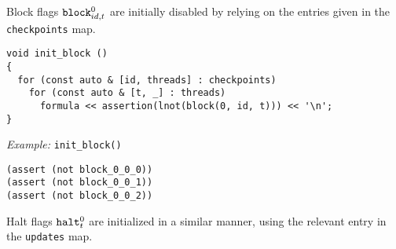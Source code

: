 \noindent
Block flags $\texttt{block}^0_{id, t}$ are initially disabled by relying on the entries given in the \texttt{checkpoints} map.

\newpage

\begin{lstlisting}[style=c++]
void init_block ()
{
  for (const auto & [id, threads] : checkpoints)
    for (const auto & [t, _] : threads)
      formula << assertion(lnot(block(0, id, t))) << '\n';
}
\end{lstlisting}

\noindent
\emph{Example:} \lstinline[style=c++]{init_block()}

\begin{lstlisting}[language=SMTLib]
(assert (not block_0_0_0))
(assert (not block_0_0_1))
(assert (not block_0_0_2))
\end{lstlisting}


\noindent
Halt flags $\texttt{halt}^0_t$ are initialized in a similar manner, using the relevant entry in the \texttt{updates} map.

